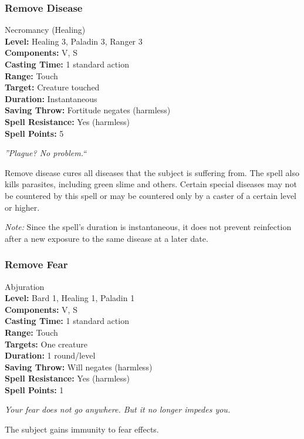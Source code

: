\subsubsection{Remove Disease}
\label{Spell:RemoveDisease}
Necromancy (Healing)
\\ \textbf{Level:} Healing 3, Paladin 3, Ranger 3
\\ \textbf{Components:} V, S
\\ \textbf{Casting Time:} 1 standard action
\\ \textbf{Range:} Touch
\\ \textbf{Target:} Creature touched
\\ \textbf{Duration:} Instantaneous
\\ \textbf{Saving Throw:} Fortitude negates (harmless)
\\ \textbf{Spell Resistance:} Yes (harmless)
\\ \textbf{Spell Points:} 5

\emph{''Plague? No problem.``}

Remove disease cures all diseases that the subject is suffering from. 
The spell also kills parasites, including green slime and others. 
Certain special diseases may not be countered by this spell or may be countered only by a caster of a certain level or higher.

\emph{Note:} Since the spell's duration is instantaneous, it does not prevent reinfection after a new exposure to the same disease at a later date.
\subsubsection{Remove Fear}
\label{Spell:RemoveFear}
Abjuration
\\ \textbf{Level:} Bard 1, Healing 1, Paladin 1
\\ \textbf{Components:} V, S
\\ \textbf{Casting Time:} 1 standard action
\\ \textbf{Range:} Touch
\\ \textbf{Targets:} One creature
\\ \textbf{Duration:} 1 round/level
\\ \textbf{Saving Throw:} Will negates (harmless)
\\ \textbf{Spell Resistance:} Yes (harmless)
\\ \textbf{Spell Points:} 1

\emph{Your fear does not go anywhere. But it no longer impedes you.}

The subject gains immunity to fear effects.

